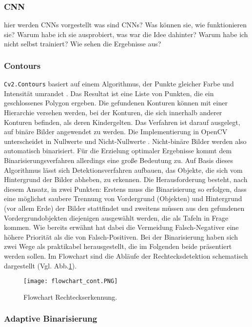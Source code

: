 \subsubsection{CNN}

hier werden CNNs vorgestellt
was sind CNNs?
Was können sie, wie funktionieren sie?
Warum habe ich sie ausprobiert, was war die Idee dahinter?
Warum habe ich nicht selbst trainiert?
Wie sehen die Ergebnisse aus?

\subsubsection{Contours}

\verb|Cv2.Contours| basiert auf einem Algorithmus, der Punkte gleicher Farbe und Intensität umrandet \cite{suzuki}. Das Resultat ist eine Liste von Punkten, die ein geschlossenes Polygon ergeben. Die gefundenen Konturen können mit einer Hierarchie versehen werden, bei der Konturen, die sich innerhalb anderer Konturen befinden, als deren \glqq Kinder\grqq gelten. Das Verfahren ist darauf ausgelegt, auf binäre Bilder angewendet zu werden. Die Implementierung in OpenCV unterscheidet in Nullwerte und Nicht-Nullwerte \cite{opencvcontours}. Nicht-binäre Bilder werden also automatisch binarisiert. Für die Erzielung optimaler Ergebnisse kommt dem Binarisierungsverfahren allerdings eine große Bedeutung zu.
Auf Basis dieses Algorithmus lässt sich Detektionsverfahren aufbauen, das Objekte, die sich vom Hintergrund der Bilder abheben, zu erkennen. Die Herausforderung besteht, nach diesem Ansatz, in zwei Punkten: Erstens muss die Binarisierung so erfolgen, dass eine möglichst saubere Trennung von Vordergrund (Objekten) und Hintergrund (vor allem Erde) der Bilder stattfindet und zweitens müssen aus den gefundenen Vordergrundobjekten diejenigen ausgewählt werden, die als Tafeln in Frage kommen. Wie bereits erwähnt hat dabei die Vermeidung Falsch-Negativer eine höhere Priorität als die von Falsch-Positiven. Bei der Binarisierung haben sich zwei Wege als praktikabel herausgestellt, die im Folgenden beide präsentiert werden sollen. Im Flowchart sind die Abläufe der Rechtecksdetektion schematisch dargestellt (Vgl. Abb.\ref{fig:flowrectdetect}).
\begin{figure}[h!]
\centering
\texttt{[image: flowchart\_cont.PNG]}
\caption{Flowchart Rechteckserkennung.}
\label{fig:flowrectdetect}
\end{figure}

\subsubsection*{Adaptive Binarisierung}

